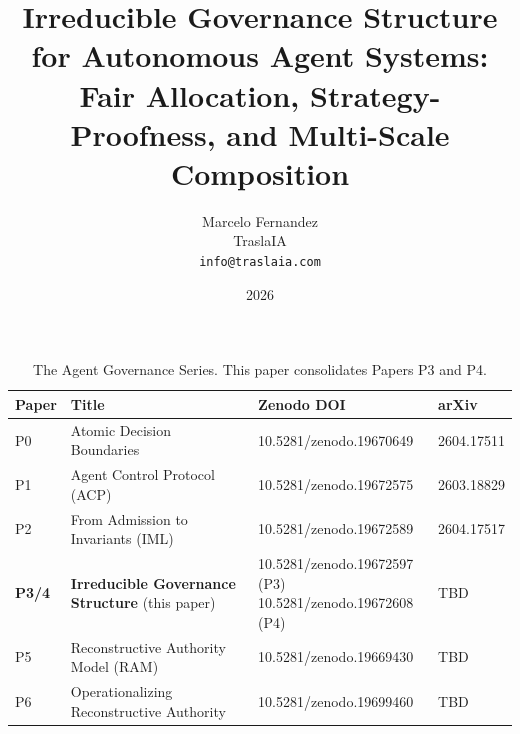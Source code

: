 \documentclass[11pt]{article}
\begin{document}
\title{\textbf{Irreducible Governance Structure for Autonomous Agent Systems:\\
Fair Allocation, Strategy-Proofness, and Multi-Scale Composition}}

\author{Marcelo Fernandez\\
TraslaIA\\
\texttt{info@traslaia.com}}

\date{2026}

\maketitle

\begin{table}[h]
\centering
\small
\caption{The Agent Governance Series. This paper consolidates Papers P3 and P4.}
\label{tab:series}
\begin{tabular}{@{}llll@{}}
\toprule
\textbf{Paper} & \textbf{Title} & \textbf{Zenodo DOI} & \textbf{arXiv} \\
\midrule
P0   & Atomic Decision Boundaries~\cite{fernandez2026a}         & 10.5281/zenodo.19670649 & 2604.17511 \\
P1   & Agent Control Protocol (ACP)~\cite{fernandez2026b}       & 10.5281/zenodo.19672575 & 2603.18829 \\
P2   & From Admission to Invariants (IML)~\cite{fernandez2026c} & 10.5281/zenodo.19672589 & 2604.17517 \\
\textbf{P3/4} & \textbf{Irreducible Governance Structure} (this paper) & \makecell[l]{10.5281/zenodo.19672597 (P3)\\10.5281/zenodo.19672608 (P4)} & TBD \\
P5   & Reconstructive Authority Model (RAM)~\cite{fernandez2026ram} & 10.5281/zenodo.19669430 & TBD \\
P6   & Operationalizing Reconstructive Authority~\cite{fernandez2026op} & 10.5281/zenodo.19699460 & TBD \\
\bottomrule
\end{tabular}
\end{table}
\end{document}
